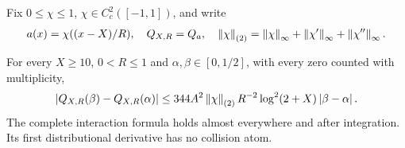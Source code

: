 Fix \(0\le\chi\le1\), \(\chi\in C_c^2([-1,1])\), and write
\[
 a(x)=\chi((x-X)/R),\quad Q_{X,R}=Q_a,\quad
 \left\lVert\chi\right\rVert_{(2)}=\left\lVert\chi\right\rVert_\infty+\left\lVert\chi'\right\rVert_\infty+
                   \left\lVert\chi''\right\rVert_\infty.
\]
\begin{theorem}\label{thm:transverse-lipschitz}
For every \(X\ge10\), \(0<R\le1\) and \(\alpha,\beta\in[0,1/2]\),
with every zero counted with multiplicity,
\begin{equation}\label{eq:transverse-lipschitz}
 \left|Q_{X,R}(\beta)-Q_{X,R}(\alpha)\right|
 \le344A^2\left\lVert\chi\right\rVert_{(2)}R^{-2}\log^2(2+X)\left|\beta-\alpha\right|.
\end{equation}
The complete interaction formula holds almost everywhere and after
integration. Its first distributional derivative has no collision atom.
\end{theorem}
